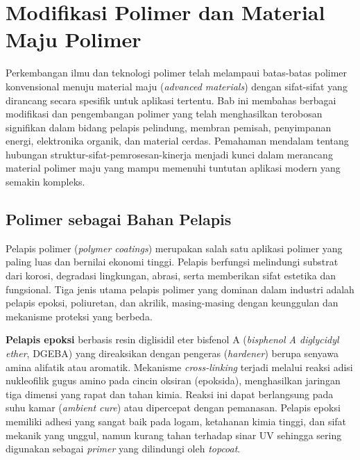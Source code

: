 \documentclass[12pt,a4paper,openany]{book}
\begin{document}

\chapter{Modifikasi Polimer dan Material Maju Polimer}

Perkembangan ilmu dan teknologi polimer telah melampaui batas-batas polimer konvensional menuju material maju (\textit{advanced materials}) dengan sifat-sifat yang dirancang secara spesifik untuk aplikasi tertentu. Bab ini membahas berbagai modifikasi dan pengembangan polimer yang telah menghasilkan terobosan signifikan dalam bidang pelapis pelindung, membran pemisah, penyimpanan energi, elektronika organik, dan material cerdas. Pemahaman mendalam tentang hubungan struktur-sifat-pemrosesan-kinerja menjadi kunci dalam merancang material polimer maju yang mampu memenuhi tuntutan aplikasi modern yang semakin kompleks.

\section{Polimer sebagai Bahan Pelapis}

Pelapis polimer (\textit{polymer coatings}) merupakan salah satu aplikasi polimer yang paling luas dan bernilai ekonomi tinggi. Pelapis berfungsi melindungi substrat dari korosi, degradasi lingkungan, abrasi, serta memberikan sifat estetika dan fungsional. Tiga jenis utama pelapis polimer yang dominan dalam industri adalah pelapis epoksi, poliuretan, dan akrilik, masing-masing dengan keunggulan dan mekanisme proteksi yang berbeda.

\textbf{Pelapis epoksi} berbasis resin diglisidil eter bisfenol A (\textit{bisphenol A diglycidyl ether}, DGEBA) yang direaksikan dengan pengeras (\textit{hardener}) berupa senyawa amina alifatik atau aromatik. Mekanisme \textit{cross-linking} terjadi melalui reaksi adisi nukleofilik gugus amino pada cincin oksiran (epoksida), menghasilkan jaringan tiga dimensi yang rapat dan tahan kimia. Reaksi ini dapat berlangsung pada suhu kamar (\textit{ambient cure}) atau dipercepat dengan pemanasan. Pelapis epoksi memiliki adhesi yang sangat baik pada logam, ketahanan kimia tinggi, dan sifat mekanik yang unggul, namun kurang tahan terhadap sinar UV sehingga sering digunakan sebagai \textit{primer} yang dilindungi oleh \textit{topcoat}.
\end{document}
